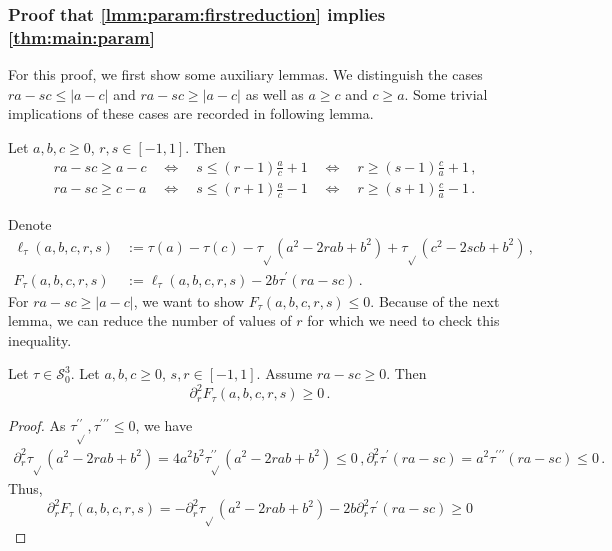 \documentclass{article}
\newcommand{\lb}{\left(} %
\newcommand{\rb}{\right)} %
\newcommand{\br}[1]{\lb #1 \rb} %
\newcommand{\brOf}[1]{\!\br{#1}} %
\newcommand{\abs}[1]{\left| #1 \right|} %
\newcommand*{\mc}[1]{\mathcal{#1}}
\newcommand{\pr}{^\prime}
\newcommand{\prr}{^{\prime\prime}}
\newcommand{\prrr}{^{\prime\prime\prime}}
\newcommand{\equationFullstop}{\, .}
\newcommand{\eqfs}{\equationFullstop}
\newcommand{\equationComma}{\, ,}
\newcommand{\eqcm}{\equationComma}
\newcommand{\tran}{\tau}
\newcommand{\trans}{\tran_{\!\sqrt{}}}
\newcommand{\ddtrans}{\trans\prr}
\newcommand{\dtran}{\tran\pr}
\newcommand{\dddtran}{\tran\prrr}
\newcommand{\setccod}[1]{\mc S_0^{#1}}
\newcommand{\lhs}{\ell_{\tran}}
\newcommand{\ifu}{F_{\tran}}
\begin{document}
\begin{appendix}
\subsubsection{Proof that \cref{lmm:param:firstreduction} implies \cref{thm:main:param}}\label{sssec:firstReduImpliesMainParam}
%
For this proof, we first show some auxiliary lemmas.
We distinguish the cases $ra-sc \leq |a-c|$ and $ra-sc \geq |a-c|$ as well as $a\geq c$ and $c \geq a$. Some trivial implications of these cases are recorded in following lemma. 
%
\begin{lemma}\label{lmm:srbound}
	Let $a,b,c\geq0$, $r,s\in[-1,1]$.
	Then
	\begin{align*}
		&ra - sc \geq a-c
		\quad\Leftrightarrow\quad 
		s 
		\leq
		(r-1) \frac ac+1
		\quad\Leftrightarrow\quad 
		r \geq 
		(s-1)\frac ca +1
		\eqcm
		\\
		&ra - sc \geq c-a
		\quad\Leftrightarrow\quad 
		s 
		\leq
		(r+1) \frac ac -1
		\quad\Leftrightarrow\quad 
		r \geq 
		(s+1)\frac ca -1
		\eqfs
	\end{align*}
\end{lemma}
%
%
Denote 
\begin{align*}
	\lhs(a,b,c,r,s) &:= \tran(a) - \tran(c) - \trans\brOf{a^2-2rab+b^2} + \trans\brOf{c^2-2scb+b^2}\eqcm\\
	\ifu(a,b,c,r,s) &:= \lhs(a,b,c,r,s) - 2 b \dtran\brOf{ra - sc}
	\eqfs
\end{align*}
%
For $ra - sc \geq \abs{a-c}$, we want to show $\ifu(a,b,c,r,s) \leq 0$. Because of the next lemma, we can reduce the number of values of $r$ for which we need to check this inequality.
%
\begin{lemma}[Convexity in $r$]\label{lmm:ddr}
	Let $\tran\in\setccod3$. Let $a,b,c\geq0$, $s,r\in[-1,1]$.
	Assume $ra - sc \geq 0$.
	Then
	\begin{equation*}
		\partial_r^2 \ifu(a,b,c,r,s) \geq 0
		\eqfs
	\end{equation*}
\end{lemma}
%
\begin{proof}
	As $\ddtrans,\dddtran\leq0$, we have
	\begin{align*}
		\partial_r^2 \trans\brOf{a^2-2rab+b^2} = 4a^2b^2\ddtrans(a^2-2rab+b^2) \leq 0\eqcm
		\partial_r^2 \dtran(ra - sc) = a^2 \dddtran(ra - sc) \leq 0
		\eqfs
	\end{align*}
	Thus, 
	\begin{equation*}
		\partial_r^2 \ifu(a,b,c,r,s) = -\partial_r^2 \trans\brOf{a^2-2rab+b^2} - 2 b \partial_r^2\dtran\brOf{ra - sc} \geq 0

\end{equation*}
\end{proof}
\end{appendix}
\end{document}

